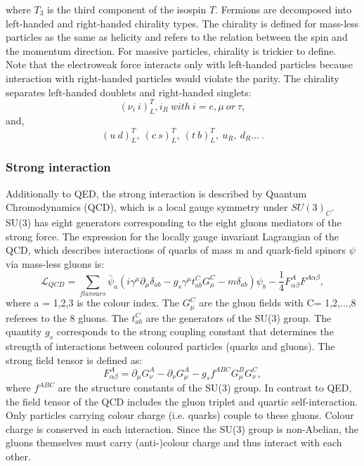 where $T_3$ is the third component of the isospin $T$.
Fermions are decomposed into left-handed and right-handed chirality types. The chirality is defined for mass-less particles as the same as helicity and refers to the relation between the spin and the momentum direction. For massive particles, chirality is trickier to define. Note that the electroweak force interacts only with left-handed particles because interaction with right-handed particles would violate the parity. The chirality separates left-handed doublets and right-handed singlets:
\begin{equation}
    (\nu_i \ i)^T_L, i_R \ with \ i = e, \mu \ or \ \tau,
\end{equation}
and, 
\begin{equation}
    (u \ d)^T_L, \ (c \ s)^T_L, \ (t \ b)^T_L, \ u_R, \ d_R ... \ . 
\end{equation}

\subsubsection{Strong interaction}
Additionally to QED, the strong interaction is described by Quantum Chromodynamics (QCD), which is a local gauge symmetry under $SU(3)_C$. SU(3) has eight generators corresponding to the eight gluons mediators of the strong force. The expression for the locally gauge invariant Lagrangian of the QCD, which describes interactions of quarks of mass m and quark-field spinors $\psi$ via mass-less gluons is:
\begin{equation}
    \mathcal{L}_{QCD} = \sum_{flavours} \bar{\psi}_a(i\gamma^\mu\partial_\mu\delta_{ab}-g_{s}\gamma^\mu t^C_{ab}G^C_\mu - m\delta_{ab})\psi_b - \frac{1}{4}F^A_{\alpha\beta}F^{A\alpha\beta},
\end{equation}
where a = 1,2,3 is the colour index. The $G^{C}_\mu$ are the gluon fields with C= 1,2,...,8 referees to the 8 gluons. The $t^C_{ab}$ are the generators of the SU(3) group. The quantity $g_{s}$ corresponds to the strong coupling constant that determines the strength of interactions between coloured particles (quarks and gluons). The strong field tensor is defined as:
\begin{equation}
    F^A_{\alpha\beta} = \partial_\mu G^A_\nu - \partial_\nu G^A_\mu - g_sf^{ABC}G^B_\mu G^C_\nu,
\end{equation}
where $f^{ABC}$ are the structure constants of the SU(3) group. In contrast to QED, the field tensor of the QCD includes the gluon triplet and quartic self-interaction. Only particles carrying colour charge (i.e. quarks) couple to these gluons. Colour charge is conserved in each interaction. Since the SU(3) group is non-Abelian, the gluons themselves must carry (anti-)colour charge and thus interact with each other. \\


